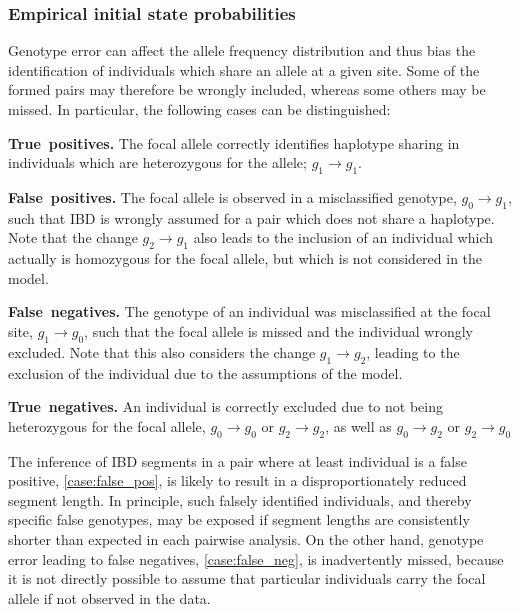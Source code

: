 %
\subsubsection{Empirical initial state probabilities}
%

Genotype error can affect the allele frequency distribution and thus bias the identification of individuals which share an allele at a given site.
Some of the formed pairs may therefore be wrongly included, whereas some others may be missed.
In particular, the following  cases can be distinguished:
\begin{case}
	\item\label{case:true_pos} \textbf{True~positives.} The focal allele correctly identifies haplotype sharing in  individuals which are heterozygous for the allele; \ie ${g_{1} \rightarrow g_{1}}$.
	\item\label{case:false_pos} \textbf{False~positives.} The focal allele is observed in a misclassified genotype, ${g_{0} \rightarrow g_{1}}$, such that IBD is wrongly assumed for a pair which does not share a haplotype.
	Note that the change ${g_{2} \rightarrow g_{1}}$ also leads to the inclusion of an individual which actually is homozygous for the focal allele, but which is not considered in the model.
	\item\label{case:false_neg} \textbf{False~negatives.} The genotype of an individual was misclassified at the focal site, ${g_{1} \rightarrow g_{0}}$, such that the focal allele is missed and the individual wrongly excluded.
	Note that this also considers the change ${g_{1} \rightarrow g_{2}}$, leading to the exclusion of the individual due to the assumptions of the model.
	\item\label{case:true_neg} \textbf{True~negatives.} An individual is correctly excluded due to not being heterozygous for the focal allele, \ie ${g_{0} \rightarrow g_{0}}$ or ${g_{2} \rightarrow g_{2}}$, as well as ${g_{0} \rightarrow g_{2}}$ or ${g_{2} \rightarrow g_{0}}$
\end{case}

The inference of IBD segments in a pair where at least  individual is a false positive, \cref{case:false_pos}, is likely to result in a disproportionately reduced segment length.
In principle, such falsely identified individuals, and thereby specific false genotypes, may be exposed if segment lengths are consistently shorter than expected in each pairwise analysis.
On the other hand, genotype error leading to false negatives, \cref{case:false_neg}, is inadvertently missed, because it is not directly possible to assume that particular individuals carry the focal allele if not observed in the data.

